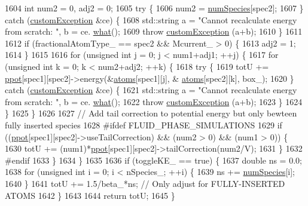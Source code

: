\begin{DoxyCode}
1604             \textcolor{keywordtype}{int} num2 = 0, adj2 = 0;
1605             \textcolor{keywordflow}{try} \{
1606                 num2 = \hyperlink{classsim_system_a9eea865e6dc1cff377b1e79c4d9c23f0}{numSpecies}[spec2];
1607             \} \textcolor{keywordflow}{catch} (\hyperlink{classcustom_exception}{customException} &ce) \{
1608                 std::string a = \textcolor{stringliteral}{"Cannot recalculate energy from scratch: "}, b = ce.
      \hyperlink{classcustom_exception_aeb6ab5848b038adfc68fde86a512f691}{what}();
1609                 \textcolor{keywordflow}{throw} \hyperlink{classcustom_exception}{customException} (a+b);
1610             \}
1611 
1612             \textcolor{keywordflow}{if} (fractionalAtomType\_ == spec2 && Mcurrent\_ > 0) \{
1613                 adj2 = 1;
1614             \}
1615 
1616             \textcolor{keywordflow}{for} (\textcolor{keywordtype}{unsigned} \textcolor{keywordtype}{int} j = 0; j < num1+adj1; ++j) \{
1617                 \textcolor{keywordflow}{for} (\textcolor{keywordtype}{unsigned} \textcolor{keywordtype}{int} k = 0; k < num2+adj2; ++k) \{
1618                     \textcolor{keywordflow}{try} \{
1619                         totU += \hyperlink{classsim_system_ad2e290b5963f132e6a3a56cee35c8e9f}{ppot}[spec1][spec2]->energy(&\hyperlink{classsim_system_a90421b19082f7fb8fc23b7264b1161e4}{atoms}[spec1][j], &
      \hyperlink{classsim_system_a90421b19082f7fb8fc23b7264b1161e4}{atoms}[spec2][k], box\_);
1620                     \} \textcolor{keywordflow}{catch} (\hyperlink{classcustom_exception}{customException} &ce) \{
1621                         std::string a = \textcolor{stringliteral}{"Cannot recalculate energy from scratch: "}, b = ce.
      \hyperlink{classcustom_exception_aeb6ab5848b038adfc68fde86a512f691}{what}();
1622                         \textcolor{keywordflow}{throw} \hyperlink{classcustom_exception}{customException} (a+b);
1623                     \}
1624                 \}
1625             \}
1626 
1627             \textcolor{comment}{// Add tail correction to potential energy but only bewteen fully inserted species}
1628 \textcolor{preprocessor}{#ifdef FLUID\_PHASE\_SIMULATIONS}
1629 \textcolor{preprocessor}{}            \textcolor{keywordflow}{if} ((\hyperlink{classsim_system_ad2e290b5963f132e6a3a56cee35c8e9f}{ppot}[spec1][spec2]->useTailCorrection) && (num2 > 0) && (num1 > 0)) \{
1630                 totU += (num1)*\hyperlink{classsim_system_ad2e290b5963f132e6a3a56cee35c8e9f}{ppot}[spec1][spec2]->tailCorrection(num2/V);
1631             \}
1632 \textcolor{preprocessor}{#endif}
1633 \textcolor{preprocessor}{}        \}
1634     \}
1635 
1636     \textcolor{keywordflow}{if} (toggleKE\_ == \textcolor{keyword}{true}) \{
1637         \textcolor{keywordtype}{double} ns = 0.0;
1638         \textcolor{keywordflow}{for} (\textcolor{keywordtype}{unsigned} \textcolor{keywordtype}{int} i = 0; i < nSpecies\_; ++i) \{
1639             ns += \hyperlink{classsim_system_a9eea865e6dc1cff377b1e79c4d9c23f0}{numSpecies}[i];
1640         \}
1641         totU += 1.5/beta\_*ns; \textcolor{comment}{// Only adjust for FULLY-INSERTED ATOMS}
1642     \}
1643 
1644     \textcolor{keywordflow}{return} totU;
1645 \}
\end{DoxyCode}
